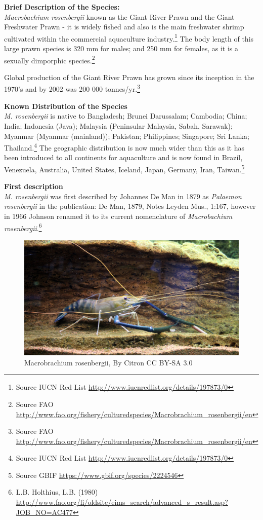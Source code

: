 \documentclass[]{book}
\theoremstyle{definition}
\theoremstyle{definition}
\theoremstyle{definition}
\theoremstyle{remark}
\begin{document}
\textbf{Brief Description of the Species:}\\
\emph{Macrobachium rosenbergii} known as the Giant River Prawn and the
Giant Freshwater Prawn - it is widely fished and also is the main
freshwater shrimp cultivated within the commercial aquaculture
industry.\footnote{Source IUCN Red List
  \url{http://www.iucnredlist.org/details/197873/0}} The body length of
this large prawn species is 320 mm for males; and 250 mm for females, as
it is a sexually dimporphic species.\footnote{Source FAO
  \url{http://www.fao.org/fishery/culturedspecies/Macrobrachium_rosenbergii/en}}

Global production of the Giant River Prawn has grown since its inception
in the 1970's and by 2002 was 200 000 tonnes/yr.\footnote{Source FAO
  \url{http://www.fao.org/fishery/culturedspecies/Macrobrachium_rosenbergii/en}}

\textbf{Known Distribution of the Species}\\
\emph{M. rosenbergii} is native to Bangladesh; Brunei Darussalam;
Cambodia; China; India; Indonesia (Java); Malaysia (Peninsular Malaysia,
Sabah, Sarawak); Myanmar (Myanmar (mainland)); Pakistan; Philippines;
Singapore; Sri Lanka; Thailand.\footnote{Source IUCN Red List
  \url{http://www.iucnredlist.org/details/197873/0}} The geographic
distribution is now much wider than this as it has been introduced to
all continents for aquaculture and is now found in Brazil, Venezuela,
Australia, United States, Iceland, Japan, Germany, Iran,
Taiwan.\footnote{Source GBIF \url{https://www.gbif.org/species/2224546}}

\textbf{First description}\\
\emph{M. rosenbergii} was first described by Johannes De Man in 1879 as
\emph{Palaemon rosenbergii} in the publication: De Man, 1879, Notes
Leyden Mus., 1:167, however in 1966 Johnson renamed it to its current
nomenclature of \emph{Macrobachium rosenbergii}.\footnote{L.B. Holthius,
  L.B. (1980)
  \url{http://www.fao.org/fi/oldsite/eims_search/advanced_s_result.asp?JOB_NO=AC477}}

\begin{figure}

{\centering \includegraphics[width=29.17in]{images_species/Macrobrachium_rosenbergii} 

}

\caption{Macrobrachium rosenbergii, By Citron CC BY-SA 3.0}\label{fig:unnamed-chunk-5}
\end{figure}
\end{document}
